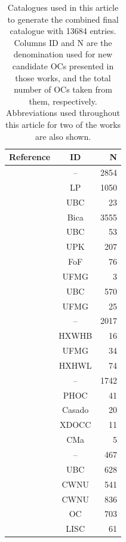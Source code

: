 \documentclass[fleqn,usenatbib]{mnras}
\begin{document}
\begin{table}
	\centering
	\caption{Catalogues used in this article to generate the combined final
	catalogue with 13684 entries. Columns ID and N are the denomination used for
	new candidate OCs presented in those works, and the total number of OCs
	taken from them, respectively. Abbreviations used throughout this
	article for two of the works are also shown.}
	\label{tab:references}
	\begin{tabular}{lcr}
		\hline
		Reference & ID & N\\
		\hline
		\cite{Kharchenko_2012}  & -- & 2854\\
		\cite{Loktin_2017}   & LP & 1050\\
		\cite{Castro_Ginard_2018} & UBC   & 23\\
		\cite{Bica_2019} &  Bica  & 3555\\
		\cite{Castro-Ginard_2019}  & UBC & 53\\
		\cite{Sim_2019}  & UPK    & 207\\
		\cite{Liu_2019}  & FoF    & 76\\
		\cite{Ferreira_2019}  & UFMG   & 3\\
		\cite{Castro-Ginard_2020}  & UBC  & 570\\
		\cite{Ferreira_2020}  & UFMG  & 25\\
		\citet[][CANTAT20]{Cantat-Gaudin_2020} & --  & 2017\\
		\cite{Hao_2020}   & HXWHB  & 16\\
		\cite{Ferreira_2021}  & UFMG   & 34\\
		\cite{He_2021}  & HXHWL  & 74\\
		\cite{Dias_2021}  &  --  & 1742\\
		\cite{Hunt_2021}  & PHOC  & 41\\
		\cite{Casado_2021}  & Casado  & 20\\
		\cite{Jaehnig_2021}   & XDOCC   & 11\\
		\cite{Santos-Silva_2021}  & CMa   & 5\\
		\cite{Tarricq_2022}   & --  & 467\\
		\cite{Castro-Ginard_2022} & UBC  & 628\\
		\cite{He_2022}  & CWNU  & 541\\
		\cite{He_2022_1}   & CWNU  & 836\\
		\cite{Hao_2022}  & OC   & 703\\
		\cite{Li_2022}  & LISC   & 61\\

\end{tabular}
\end{table}
\end{document}
